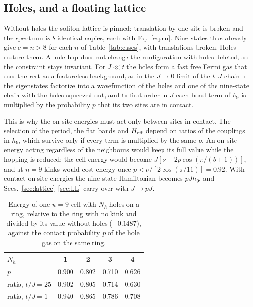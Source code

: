 \documentclass[11pt]{article}
\begin{document}
\subsection{Holes, and a floating lattice}

Without holes the soliton lattice is pinned: translation by one site is broken and the spectrum is $b$ identical copies, each with Eq.~\eqref{eq:cn}. Nine states thus already give $c=n>8$ for each $n$ of Table~\ref{tab:cases}, with translations broken. Holes restore them. A hole hop does not change the configuration with holes deleted, so the constraint stays invariant. For $J\ll t$ the holes form a fast free Fermi gas that sees the rest as a featureless background, as in the $J\to0$ limit of the $t$--$J$ chain~\cite{OgataShiba}: the eigenstates factorize into a wavefunction of the holes and one of the nine-state chain with the holes squeezed out, and to first order in $J$ each bond term of $h_9$ is multiplied by the probability $p$ that its two sites are in contact.

This is why the on-site energies must act only between sites in contact. The selection of the period, the flat bands and $H_{\rm eff}$ depend on ratios of the couplings in $h_9$, which survive only if every term is multiplied by the same $p$. An on-site energy acting regardless of the neighbours would keep its full value while the hopping is reduced; the cell energy would become $J[\nu-2p\cos(\pi/(b+1))]$, and at $n=9$ kinks would cost energy once $p<\nu/[2\cos(\pi/11)]=0.92$. With contact on-site energies the nine-state Hamiltonian becomes $pJh_9$, and Secs.~\ref{sec:lattice}--\ref{sec:LL} carry over with $J\to pJ$.

\begin{table}[t]
\centering
\caption{\label{tab:holes}Energy of one $n=9$ cell with $N_h$ holes on a ring, relative to the ring with no kink and divided by its value without holes ($-0.1487$), against the contact probability $p$ of the hole gas on the same ring.}
\smallskip
\begin{tabular}{lcccc}
\toprule
$N_h$ & 1 & 2 & 3 & 4\\
\midrule
$p$ & 0.900 & 0.802 & 0.710 & 0.626\\
ratio, $t/J=25$ & 0.902 & 0.805 & 0.714 & 0.630\\
ratio, $t/J=1$ & 0.940 & 0.865 & 0.786 & 0.708\\
\bottomrule
\end{tabular}
\end{table}
\end{document}

